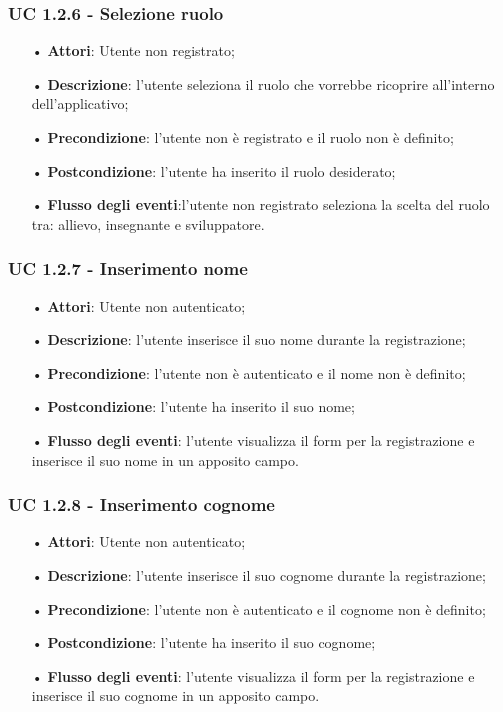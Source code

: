 \subsubsection{UC 1.2.6 - Selezione ruolo}
\begin{itemize}
	\item[•]\textbf{Attori}: Utente non registrato;
	\item[•]\textbf{Descrizione}: l'utente seleziona il ruolo che vorrebbe ricoprire all'interno dell'applicativo;
	\item[•]\textbf{Precondizione}: l'utente non è registrato e il ruolo non è definito;
	\item[•]\textbf{Postcondizione}: l'utente ha inserito il ruolo desiderato;
	\item[•]\textbf{Flusso degli eventi}:l'utente non registrato seleziona la scelta del ruolo tra: allievo, insegnante e sviluppatore.
\end{itemize}

\subsubsection{UC 1.2.7 - Inserimento nome}
\begin{itemize}
\item[•]\textbf{Attori}: Utente non autenticato;
\item[•]\textbf{Descrizione}: l'utente inserisce il suo nome durante la registrazione;
\item[•]\textbf{Precondizione}: l'utente non è autenticato e il nome non è definito;
\item[•]\textbf{Postcondizione}: l'utente ha inserito il suo nome;
\item[•]\textbf{Flusso degli eventi}: l'utente visualizza il form per la registrazione e inserisce il suo nome in un apposito campo.
\end{itemize}

\subsubsection{UC 1.2.8 - Inserimento cognome}
\begin{itemize}
	\item[•]\textbf{Attori}: Utente non autenticato;
	\item[•]\textbf{Descrizione}: l'utente inserisce il suo cognome durante la registrazione;
	\item[•]\textbf{Precondizione}: l'utente non è autenticato e il cognome non è definito;
	\item[•]\textbf{Postcondizione}: l'utente ha inserito il suo cognome;
	\item[•]\textbf{Flusso degli eventi}: l'utente visualizza il form per la registrazione e inserisce il suo cognome in un apposito campo.
\end{itemize}

